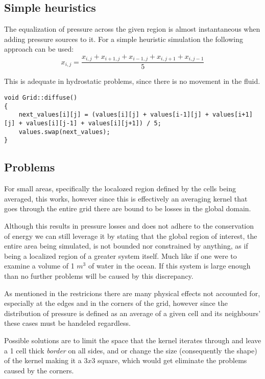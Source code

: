 \documentclass[15pt, titlepage]{article}
\begin{document}
\subsection{Simple heuristics}

The equalization of pressure across the given region is almost instantaneous when adding pressure sources to it. For a simple heuristic simulation the following approach can be used:
\[ 
x_{i, j} = \frac{x_{i, j} + x_{i+1, j} + x_{i-1, j} + x_{i, j+1} + x_{i, j-1}}{5}
\]

This is adequate in hydrostatic problems, since there is no movement in the fluid.

\begin{lstlisting}
void Grid::diffuse()
{
	next_values[i][j] = (values[i][j] + values[i-1][j] + values[i+1][j] + values[i][j-1] + values[i][j+1]) / 5;
	values.swap(next_values);
}
\end{lstlisting}

\subsection{Problems}
For small areas, specifically the localozed region defined by the cells being averaged, this works, however since this is effectively an averaging kernel that goes through the entire grid there are bound to be losses in the global domain. 

\bigskip

Although this results in pressure losses and does not adhere to the conservation of energy we can still leverage it by stating that the global region of interest, the entire area being simulated, is not bounded nor constrained by anything, as if being a localized region of a greater system itself. Much like if one were to examine a volume of 1 $m^3$ of water in the ocean. If this system is large enough than no further problems will be caused by this discrepancy.

\bigskip

As mentioned in the restricions there are many physical effects not accounted for, especially at the edges and in the corners of the grid, however since the distribution of pressure is defined as an average of a given cell and its neighbours' these cases must be handeled regardless.

Possible solutions are to limit the space that the kernel iterates through and leave a 1 cell thick \textit{border} on all sides, and or change the size (consequently the shape) of the kernel making it a $3x3$ square, which would get eliminate the problems caused by the corners.
\end{document}
